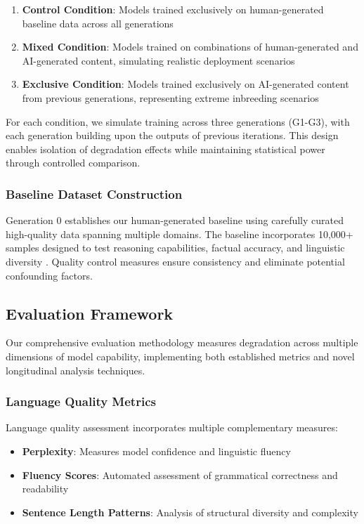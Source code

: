 \documentclass{article}
\begin{document}
\begin{enumerate}
\item \textbf{Control Condition}: Models trained exclusively on human-generated baseline data across all generations
\item \textbf{Mixed Condition}: Models trained on combinations of human-generated and AI-generated content, simulating realistic deployment scenarios
\item \textbf{Exclusive Condition}: Models trained exclusively on AI-generated content from previous generations, representing extreme inbreeding scenarios
\end{enumerate}

For each condition, we simulate training across three generations (G1-G3), with each generation building upon the outputs of previous iterations. This design enables isolation of degradation effects while maintaining statistical power through controlled comparison.

\subsubsection{Baseline Dataset Construction}

Generation 0 establishes our human-generated baseline using carefully curated high-quality data spanning multiple domains. The baseline incorporates 10,000+ samples designed to test reasoning capabilities, factual accuracy, and linguistic diversity \citep{wasserman2006all}. Quality control measures ensure consistency and eliminate potential confounding factors.

\subsection{Evaluation Framework}

Our comprehensive evaluation methodology measures degradation across multiple dimensions of model capability, implementing both established metrics and novel longitudinal analysis techniques.

\subsubsection{Language Quality Metrics}

Language quality assessment incorporates multiple complementary measures:
\begin{itemize}
\item \textbf{Perplexity}: Measures model confidence and linguistic fluency \citep{shannon1948mathematical}
\item \textbf{Fluency Scores}: Automated assessment of grammatical correctness and readability
\item \textbf{Sentence Length Patterns}: Analysis of structural diversity and complexity
\end{itemize}
\end{document}
